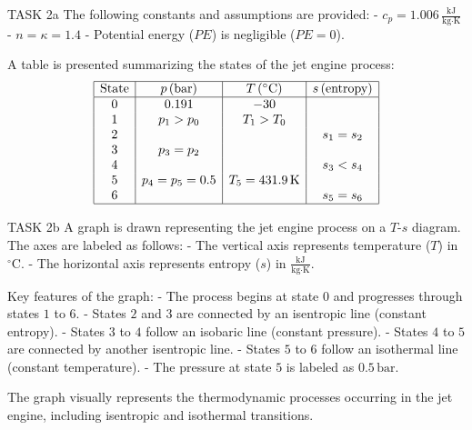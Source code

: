 TASK 2a  
The following constants and assumptions are provided:  
- \( c_p = 1.006 \, \frac{\text{kJ}}{\text{kg·K}} \)  
- \( n = \kappa = 1.4 \)  
- Potential energy (\( PE \)) is negligible (\( PE = 0 \)).  

A table is presented summarizing the states of the jet engine process:  
\[
\begin{array}{|c|c|c|c|}
\hline
\text{State} & p \, (\text{bar}) & T \, (^\circ\text{C}) & s \, (\text{entropy}) \\
\hline
0 & 0.191 & -30 & \\
1 & p_1 > p_0 & T_1 > T_0 & \\
2 & & & s_1 = s_2 \\
3 & p_3 = p_2 & & \\
4 & & & s_3 < s_4 \\
5 & p_4 = p_5 = 0.5 & T_5 = 431.9 \, \text{K} & \\
6 & & & s_5 = s_6 \\
\hline
\end{array}
\]

TASK 2b  
A graph is drawn representing the jet engine process on a \( T \)-\( s \) diagram. The axes are labeled as follows:  
- The vertical axis represents temperature (\( T \)) in \( ^\circ\text{C} \).  
- The horizontal axis represents entropy (\( s \)) in \( \frac{\text{kJ}}{\text{kg·K}} \).  

Key features of the graph:  
- The process begins at state \( 0 \) and progresses through states \( 1 \) to \( 6 \).  
- States \( 2 \) and \( 3 \) are connected by an isentropic line (constant entropy).  
- States \( 3 \) to \( 4 \) follow an isobaric line (constant pressure).  
- States \( 4 \) to \( 5 \) are connected by another isentropic line.  
- States \( 5 \) to \( 6 \) follow an isothermal line (constant temperature).  
- The pressure at state \( 5 \) is labeled as \( 0.5 \, \text{bar} \).  

The graph visually represents the thermodynamic processes occurring in the jet engine, including isentropic and isothermal transitions.